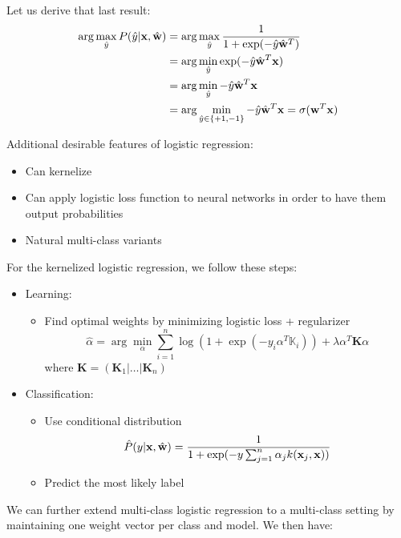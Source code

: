 \documentclass[a4paper,10pt,twoside]{article}
\begin{document}
Let us derive that last result:
\begin{align*}
  \arg\max_{\hat{y}}P(\hat{y}|\mathbf{x},\hat{\mathbf{w}}) &=\arg\max_{\hat{y}}{1\over 1+\exp(-\hat{y}\hat{\mathbf{w}}^T)}\\
  &=\arg\min_{\hat{y}}\exp(-\hat{y}\hat{\mathbf{w}}^T\mathbf{x}) \\
  &=\arg\min_{\hat{y}}-\hat{y}\hat{\mathbf{w}}^T\mathbf{x}\\
  &=\arg\min_{\hat{y}\in\{+1,-1\}}-\hat{y}\hat{\mathbf{w}}^T\mathbf{x}=\sigma(\mathbf{w}^T\mathbf{x})
\end{align*}

Additional desirable features of logistic regression:
\begin{itemize}
\item Can kernelize
\item Can apply logistic loss function to neural networks in order to have them output probabilities
\item Natural multi-class variants
\end{itemize}

For the kernelized logistic regression, we follow these steps:
\begin{itemize}
\item Learning:
  \begin{itemize}
  \item Find optimal weights by minimizing logistic loss + regularizer
    \begin{equation*}
      \hat{\alpha} = \arg\min_{\alpha}\sum_{i=1}^{n}\log(1+\exp(-y_i\alpha^T\mathbb{K}_i))+\lambda\alpha^T\mathbf{K}\alpha
    \end{equation*}
    where $\mathbf{K} = (\mathbf{K}_1|\ldots|\mathbf{K}_n)$
  \end{itemize}
  \item Classification:
    \begin{itemize}
    \item Use conditional distribution
      \begin{equation*}
        \hat{P}(y|\mathbf{x},\hat{\mathbf{w}}) = {1\over 1+\exp(-y\sum_{j=1}^{n}\alpha_jk(\mathbf{x}_j,\mathbf{x}))}
    \end{equation*}
    \item Predict the most likely label
    \end{itemize}
  \end{itemize}

We can further extend multi-class logistic regression to a multi-class setting by maintaining one weight vector per class and model. We then have:
\end{document}
